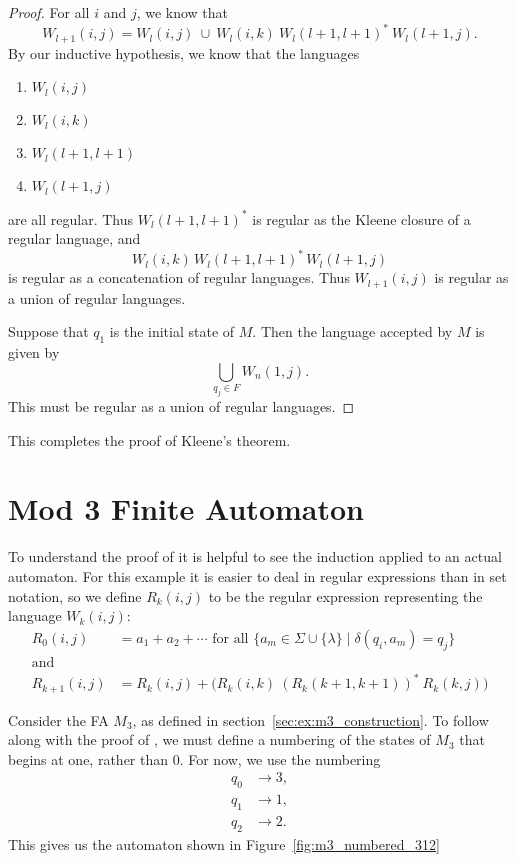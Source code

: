 \documentclass{bcthesis}
\begin{document}
\begin{proof}
		For all $i$ and $j$, we know that 
		\[
			W_{l+1}(i, j) = W_l(i, j) \ \cup \ W_l(i, k)\ W_l(l+1, l+1)^* \ W_l(l+1, j).
		\]
		By our inductive hypothesis, we know that the languages 
		\begin{enumerate}[label = (\roman*), itemsep = -0.3 ex, nolistsep]
			\item $W_l(i, j)$
			\item $W_l(i, k)$
			\item $W_l(l+1, l+1)$
			\item $W_l(l+1, j)$
		\end{enumerate}
		are all regular.
		Thus $W_l(l+1, l+1)^*$ is regular as the Kleene closure of a regular language, and 
		\[
			W_l(i, k)\, W_l(l+1, l+1)^*\, W_l(l+1, j)
		\] 
		is regular as a concatenation of regular languages.
		Thus $W_{l+1}(i, j)$ is regular as a union of regular languages.

		Suppose that $q_1$ is the initial state of $M$.
		Then the language accepted by $M$ is given by
		\[
			\bigcup_{q_j \in F} W_n(1, j).
		\]
		This must be regular as a union of regular languages.
	\end{proof}
	

	This completes the proof of Kleene's theorem.



\label{sec:examples}

	\section{Mod 3 Finite Automaton} %
	\label{sec:mod_3_finite_automaton}
	
		To understand the proof of  it is helpful to see the induction applied to an actual automaton.
		For this example it is easier to deal in regular expressions than in set notation, so we define $R_k(i, j)$ to be the regular expression representing the language $W_k (i, j)$:
		\begin{align*}
			R_0(i, j) &= a_1 + a_2 + \cdots \text{ for all } \{ a_m \in \Sigma \cup \{ \lambda \} \mid \delta(q_i, a_m) = q_j \} \\
			\text{and}\\
			R_{k+1}(i, j) &= R_k(i, j) + \big( R_k(i, k) \ (R_k(k+1, k+1))^* \ R_k(k, j) \big)
		\end{align*}
		

		Consider the FA $M_3$, as defined in section~\ref{sec:ex:m3_construction}.
		To follow along with the proof of , we must define a numbering of the states of $M_3$ that begins at one, rather than 0.
		For now, we use the numbering
		\begin{align*}
			q_0 &\to 3, \\
			q_1 &\to 1, \\
			q_2 &\to 2.
		\end{align*}
		This gives us the automaton shown in Figure~\ref{fig:m3_numbered_312}
		
\end{document}
